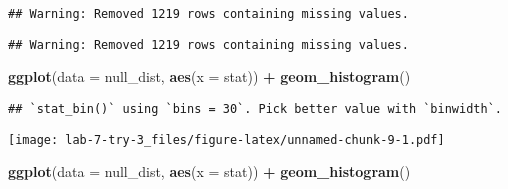 \documentclass[
]{article}
\newenvironment{Shaded}{\begin{snugshade}}{\end{snugshade}}
\newcommand{\DataTypeTok}[1]{\textcolor[rgb]{0.13,0.29,0.53}{#1}}
\newcommand{\DecValTok}[1]{\textcolor[rgb]{0.00,0.00,0.81}{#1}}
\newcommand{\KeywordTok}[1]{\textcolor[rgb]{0.13,0.29,0.53}{\textbf{#1}}}
\newcommand{\NormalTok}[1]{#1}
\newcommand{\OperatorTok}[1]{\textcolor[rgb]{0.81,0.36,0.00}{\textbf{#1}}}
\newcommand{\StringTok}[1]{\textcolor[rgb]{0.31,0.60,0.02}{#1}}
\begin{document}
\begin{verbatim}
## Warning: Removed 1219 rows containing missing values.
\end{verbatim}

\begin{Shaded}
\end{Shaded}

\begin{verbatim}
## Warning: Removed 1219 rows containing missing values.
\end{verbatim}

\begin{Shaded}
\begin{Highlighting}[]
\KeywordTok{ggplot}\NormalTok{(}\DataTypeTok{data =}\NormalTok{ null_dist, }\KeywordTok{aes}\NormalTok{(}\DataTypeTok{x =}\NormalTok{ stat)) }\OperatorTok{+}
\StringTok{  }\KeywordTok{geom_histogram}\NormalTok{()}
\end{Highlighting}
\end{Shaded}

\begin{verbatim}
## `stat_bin()` using `bins = 30`. Pick better value with `binwidth`.
\end{verbatim}

\texttt{[image: lab-7-try-3\_files/figure-latex/unnamed-chunk-9-1.pdf]}

\begin{Shaded}
\begin{Highlighting}[]
\KeywordTok{ggplot}\NormalTok{(}\DataTypeTok{data =}\NormalTok{ null_dist, }\KeywordTok{aes}\NormalTok{(}\DataTypeTok{x =}\NormalTok{ stat)) }\OperatorTok{+}
\StringTok{  }\KeywordTok{geom_histogram}\NormalTok{()}
\end{Highlighting}
\end{Shaded}
\end{document}
